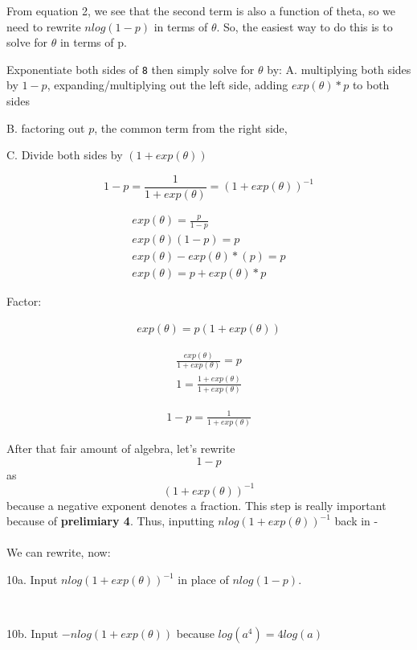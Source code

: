 \documentclass[
]{article}
\begin{document}
From equation 2, we see that the second term is also a function of
theta, so we need to rewrite \(nlog(1-p)\) in terms of \(\theta\). So,
the easiest way to do this is to solve for \(\theta\) in terms of p.

Exponentiate both sides of \texttt{8} then simply solve for \(\theta\)
by: A. multiplying both sides by \(1-p\), expanding/multiplying out the
left side, adding \(exp(\theta)*p\) to both sides

B. factoring out \(p\), the common term from the right side,

C. Divide both sides by \((1+exp(\theta))\)

\[1 - p = \frac{1}{1 + exp(\theta)} = (1+exp(\theta))^{-1}\]

\begin{align}
\tag{9a}
exp(\theta) = \frac{p}{1-p} \\
exp(\theta)(1-p) = p \\
exp(\theta)-exp(\theta)*(p) = p \\
exp(\theta) = p + exp(\theta)*p 
\end{align}

Factor:

\begin{align}
\tag{9b}
exp(\theta) = p(1 + exp(\theta)) 
\end{align}

\begin{align}
\tag{9c}
\frac{exp(\theta)}{1+exp(\theta)} = p \\
1 = \frac{1 + exp(\theta)}{1+exp(\theta)}
\end{align}

\begin{align}
\tag{9d}
1 - p = \frac{1}{1 + exp(\theta)} 
\end{align}

After that fair amount of algebra, let's rewrite \[1 - p\] as
\[(1+exp(\theta))^{-1}\] because a negative exponent denotes a fraction.
This step is really important because of \textbf{prelimiary 4}. Thus,
inputting \(nlog(1+exp(\theta))^{-1}\) back in -\\
\hspace*{0.333em}\\
We can rewrite, now: ~

10a. Input \(nlog(1+exp(\theta))^{-1}\) in place of \(nlog(1-p)\).

~

10b. Input \(-nlog(1+exp(\theta))\) because \(log(a^4) = 4log(a)\)

~
\end{document}
